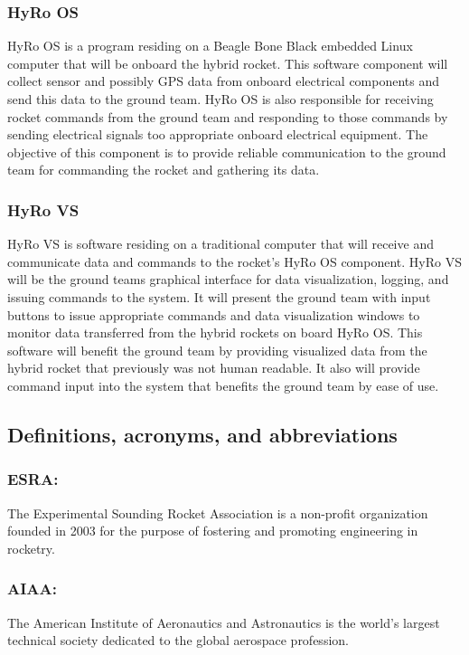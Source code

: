 \documentclass[10pt,draftclsnofoot,onecolumn,compsoc]{IEEEtran}
\begin{document}
\subsubsection{HyRo OS}
 HyRo OS is a program residing on a Beagle Bone Black embedded Linux computer that will be onboard the hybrid rocket. This software component will collect sensor and possibly
 GPS data from onboard electrical components and send this data to the ground team. HyRo OS is also responsible for receiving rocket commands from the ground team and responding to those
 commands by sending electrical signals too appropriate onboard electrical equipment. The objective of this component is to provide reliable communication to the ground team for commanding
 the rocket and gathering its data. 
\subsubsection{HyRo VS}
HyRo VS is software residing on a traditional computer that will receive and communicate data and commands to the rocket's HyRo OS component. HyRo VS will be the ground teams graphical interface for data visualization, logging, and issuing commands to the system. It will present the ground team with input buttons to issue appropriate commands and data visualization windows to monitor data transferred from the hybrid rockets on board HyRo OS. This software will benefit the ground team by providing  visualized data from the hybrid rocket that previously was not human readable. It also will provide command input into the system that benefits the ground team by ease of use.
\subsection{Definitions, acronyms, and abbreviations}
\subsubsection{\bf ESRA:}  The Experimental Sounding Rocket Association is a non-profit organization founded in 2003 for the purpose of fostering and promoting engineering in rocketry.
\subsubsection{\bf AIAA:} The American Institute of Aeronautics and Astronautics is the world's largest technical society dedicated to the global aerospace profession.
\end{document}
